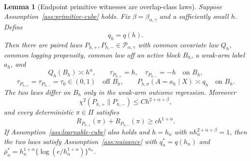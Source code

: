 \documentclass[11pt]{article}
\theoremstyle{definition}
\theoremstyle{plain}
\newtheorem{lemma}{Lemma}
\theoremstyle{remark}
\begin{document}
\begin{lemma}[Endpoint primitive witnesses are overlap-class laws]\label{lem:witness-membership}
Suppose Assumption~\ref{ass:primitive-cube} holds.  Fix
\(\beta=\beta_{\alpha,\gamma}\) and a sufficiently small \(h\).  Define
\[
q_h=q(h).
\]
Then there are paired laws \(P_{h,+},P_{h,-}\in\mathcal P_{\alpha,\gamma}\)
with common covariate law \(Q_h\), common logging propensity, common law off
an active block \(B_h\), a weak-arm label \(a_h\), and
\[
Q_h(B_h)\asymp h^\alpha,\qquad
\tau_{P_{h,+}}=h,\quad \tau_{P_{h,-}}=-h\quad\text{on }B_h,
\]
\[
\tau_{P_{h,+}}=\tau_{P_{h,-}}=\tau_0\in(0,1)\quad\text{off }B_h,\qquad
P_{h,\sigma}(A=a_h\mid X)\asymp q_h\quad\text{on }B_h.
\]
The two laws differ on \(B_h\) only in the weak-arm outcome regression.
Moreover
\[
\chi^2(P_{h,+}\|P_{h,-})\le C h^{2+\alpha+\beta},
\]
and every deterministic \(\pi\in\Pi\) satisfies
\[
R_{P_{h,+}}(\pi)+R_{P_{h,-}}(\pi)\ge c h^{1+\alpha}.
\]
If Assumption~\ref{ass:learnable-cube} also holds and \(h=h_n\) with
\(n h_n^{2+\alpha+\beta}=1\), then the two laws satisfy
Assumption~\ref{ass:nuisance} with \(q_n^*=q(h_n)\) and
\(\bar\rho_n^*=h_n^{1+\alpha}\{\log(e/h_n^{1+\alpha})\}^{a_\alpha}\).
\end{lemma}
\end{document}
